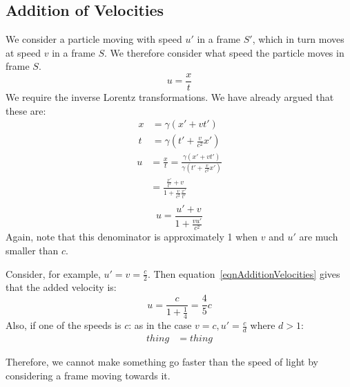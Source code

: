 \documentclass[../Main.tex]{subfiles}
\begin{document}
\subsection{Addition of Velocities}
We consider a particle moving with speed $u'$ in a frame $S'$, which in turn moves at speed $v$ in a frame $S$. We therefore consider what speed the particle moves in frame $S$.
\begin{equation*}
    u = \frac{x}{t}
\end{equation*}
We require the inverse Lorentz transformations. We have already argued that these are:
\begin{align*}
    x &= \gamma (x' + vt') \\
    t &= \gamma (t' + \frac{v}{c^2}x')
\end{align*}
\begin{align*}
    u &= \frac{x}{t} = \frac{\gamma(x' + vt')}{\gamma(t' + \frac{v}{c^2}x')} \\
    &= \frac{\frac{x'}{t'} + v}{1 + \frac{v}{c^2}\frac{x'}{t'}} \\
\end{align*}
\begin{equation}
    u = \frac{u' + v}{1 + \frac{vu'}{c^2}}
    \label{eqnAdditionVelocities}
\end{equation}
Again, note that this denominator is approximately 1 when $v$ and $u'$ are much smaller than $c$.
\begin{example}
    Consider, for example, $u' = v = \frac{c}{2}$. Then equation~\ref{eqnAdditionVelocities} gives that the added velocity is:
    \begin{equation*}
        u = \frac{c}{1 + \frac{1}{4}} = \frac{4}{5} c
    \end{equation*}
    Also, if one of the speeds is $c$: as in the case $v = c, u' = \frac{c}{d}$ where $d > 1$:
    \begin{align*}
        thing &= thing %
    \end{align*}
\end{example}
Therefore, we cannot make something go faster than the speed of light by considering a frame moving towards it.
\end{document}
